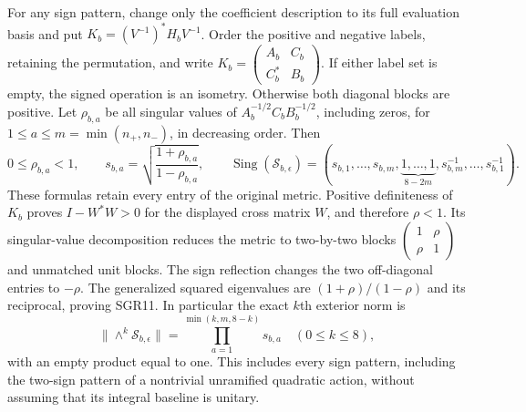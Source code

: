 \documentclass[11pt]{article}
\newcommand{\C}{\mathbb C}
\begin{document}
For any sign pattern, change only the coefficient description to its
full evaluation basis and put $K_b=(V^{-1})^*H_bV^{-1}$.
Order the positive and negative labels, retaining the permutation, and
write $K_b=\left(\begin{smallmatrix}A_b&C_b\\C_b^*&B_b\end{smallmatrix}\right)$.
If either label set is empty, the signed operation is an isometry.
Otherwise both diagonal blocks are positive. Let $\rho_{b,a}$ be
all singular values of $A_b^{-1/2}C_bB_b^{-1/2}$, including zeros,
for $1\le a\le m=\min(n_+,n_-)$, in decreasing order. Then
\[
 0\le\rho_{b,a}<1,\qquad
 s_{b,a}=\sqrt{\frac{1+\rho_{b,a}}{1-\rho_{b,a}}},\qquad
 \operatorname{Sing}(\mathscr S_{b,\epsilon})
   =(s_{b,1},\ldots,s_{b,m},
          \underbrace{1,\ldots,1}_{8-2m},
          s_{b,m}^{-1},\ldots,s_{b,1}^{-1}).
 \tag{SGR11}
\]
These formulas retain every entry of the original metric. Positive
definiteness of $K_b$ proves $I-W^*W>0$ for the displayed cross
matrix $W$, and therefore $\rho<1$. Its singular-value decomposition
reduces the metric to two-by-two blocks
$\left(\begin{smallmatrix}1&\rho\\\rho&1\end{smallmatrix}\right)$
and unmatched unit blocks. The sign reflection changes the two
off-diagonal entries to $-\rho$. The generalized squared eigenvalues
are $(1+\rho)/(1-\rho)$ and its reciprocal, proving SGR11.
In particular the exact $k$th exterior norm is
\[
 \|\wedge^k\mathscr S_{b,\epsilon}\|
    =\prod_{a=1}^{\min(k,m,8-k)}s_{b,a}\quad(0\le k\le8),
 \tag{SGR12}
\]
with an empty product equal to one. This includes every sign pattern,
including the two-sign pattern of a nontrivial unramified quadratic
action, without assuming that its integral baseline is unitary.
\end{document}
